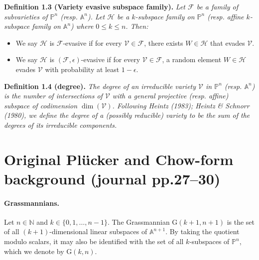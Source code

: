 \documentclass[10pt,a4paper]{article}
\newcommand{\PP}{\mathbb P}
\newcommand{\Aspace}{\mathbb A}
\newcommand{\GG}{\mathrm G}
\newenvironment{result}[1]{\par\medskip\noindent\textbf{#1.}\itshape}{\par\medskip}
\begin{document}
\begin{result}{Definition 1.3 (Variety evasive subspace family)}
Let $\mathcal F$ be a family of subvarieties of $\PP^n$ (resp. $\Aspace^n$). Let $\mathcal H$ be a $k$-subspace family on $\PP^n$ (resp. affine $k$-subspace family on $\Aspace^n$) where $0\le k\le n$. Then:
\begin{itemize}\item We say $\mathcal H$ is $\mathcal F$-evasive if for every $\mathcal V\in\mathcal F$, there exists $W\in\mathcal H$ that evades $\mathcal V$.
\item We say $\mathcal H$ is $(\mathcal F,\epsilon)$-evasive if for every $\mathcal V\in\mathcal F$, a random element $W\in\mathcal H$ evades $\mathcal V$ with probability at least $1-\epsilon$.\end{itemize}
\end{result}
\begin{result}{Definition 1.4 (degree)}
The degree of an irreducible variety $\mathcal V$ in $\PP^n$ (resp. $\Aspace^n$) is the number of intersections of $\mathcal V$ with a general projective (resp. affine) subspace of codimension $\dim(\mathcal V)$. Following Heintz (1983); Heintz \& Schnorr (1980), we define the degree of a (possibly reducible) variety to be the sum of the degrees of its irreducible components.
\end{result}
\section*{Original Pl\"ucker and Chow-form background (journal pp.27--30)}
\paragraph{Grassmannians.}
Let $n\in\mathbb N$ and $k\in\{0,1,\ldots,n-1\}$. The Grassmannian $\GG(k+1,n+1)$ is the set of all $(k+1)$-dimensional linear subspaces of $\Aspace^{n+1}$. By taking the quotient modulo scalars, it may also be identified with the set of all $k$-subspaces of $\PP^n$, which we denote by $\GG(k,n)$.
\end{document}
